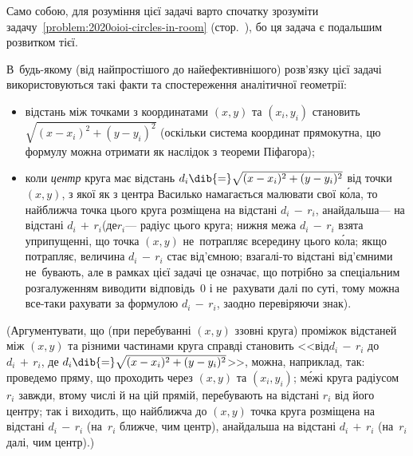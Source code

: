 \Tutorial

Само собою, для розуміння цієї задачі варто спочатку зрозуміти задачу~\ref{problem:2020oioi-circles-in-room} (стор.~\pageref{problem:2020oioi-circles-in-room}), бо ця задача є подальшим розвитком тієї.

В~будь-якому (від найпростішого до найефективнішого) розв'язку цієї задачі використовуються такі факти та спостереження аналітичної геометрії:
\begin{itemize}
\item
відстань між точками з координатами $(x,y)$ та $(x_i,y_i)$ становить $\sqrt{(x-x_i)^2+(y-y_i)^2}$ (оскільки система координат прямокутна, цю формулу можна отримати як наслідок з теореми Піфагора);
\item
коли \emph{центр} круга має відстань $d_i\dib{{=}}\sqrt{(x-x_i)^2+(y-y_i)^2}$ від точки $(x,y)$, з якої як з центра Василько намагається малювати свої к\'{о}ла, то найближча точка цього круга розміщена на відстані ${d_i\,{-}\,r_i}$, а\nolinebreak[2] найдальша\nolinebreak[3] --- на відстані ${d_i\,{+}\,r_i}$\linebreak[2] (де\nolinebreak[2] $r_i$\nolinebreak[3] --- радіус цього круга; нижня межа ${d_i\,{-}\,r_i}$ взята у\nolinebreak[2] припущенні, що точка $(x,y)$ не~потрапляє всередину цього к\'{о}ла; якщо потрапляє, величина ${d_i\,{-}\,r_i}$ стає від'ємною; взагалі-то відстані від'ємними не~бувають, але в рамках цієї задачі це означає, що потрібно за спеціальним розгалуженням виводити відповідь~0 і не~рахувати далі по суті, тому можна все-таки рахувати за формулою ${d_i\,{-}\,r_i}$, заодно перевіряючи знак). 

\end{itemize}


\begin{footnotesize}

(Аргументувати, що (при перебуванні $(x,y)$ ззовні круга) проміжок відстаней між $(x,y)$ та різними частинами круга справді становить <<від\nolinebreak[2] ${d_i\,{-}\,r_i}$ до ${d_i\,{+}\,r_i}$, де $d_i\dib{{=}}\sqrt{(x-x_i)^2+(y-y_i)^2}$>>, можна, наприклад, так: проведемо пряму, що проходить через $(x,y)$ та $(x_i,y_i)$; м\'{е}жі круга радіусом~$r_i$ завжди, в\nolinebreak[3] тому числі й на цій прямій, перебувають на відстані $r_i$ від його центру; так і виходить, що найближча до $(x,y)$ точка круга розміщена на відстані ${d_i\,{-}\,r_i}$ (на~$r_i$ ближче, чим центр), а\nolinebreak[2] найдальша на відстані ${d_i\,{+}\,r_i}$ (на~$r_i$ далі, чим центр).)

\end{footnotesize}

